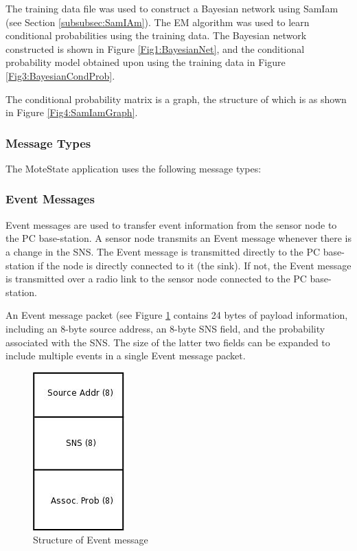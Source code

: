 \documentclass{sig-alternate-10pt}
\begin{document}
The training data file was used to construct a Bayesian network using SamIam
\cite{Samiam:2004}  (see Section \ref{subsubsec:SamIAm}). The EM algorithm
\cite{EMAlgoDempster:1977} was used to learn conditional probabilities using the
training data. The Bayesian network constructed is shown in Figure \ref{Fig1:BayesianNet}, and the
conditional probability model obtained upon using the training data  in Figure
\ref{Fig3:BayesianCondProb}.
 
 The conditional probability matrix is a graph, the structure of which is as
 shown in Figure \ref{Fig4:SamIamGraph}.
 



\subsubsection{Message Types} \label{subsubsec:MsgTypes}

The MoteState application uses the following message types:


\subsubsection*{Event Messages}

Event messages are used to transfer event information from the sensor node to the PC base-station. A sensor node transmits an Event message whenever there is a change in the SNS. The Event message is transmitted directly to the PC base-station if the node is directly connected to it (the sink). If not, the Event message is transmitted over a radio link to the sensor node connected to the PC base-station.

An Event message packet (see Figure \ref{Fig7:EventMsgStruct} contains 24 bytes of payload information, including an 8-byte source address, an 8-byte SNS field, and the probability associated with the SNS. The size of the latter two fields can be expanded to include multiple events in a single Event message packet.

  \begin{figure}[h]
\centering
\includegraphics[scale=0.5]{img/EventMsgStruct.png}
\caption{Structure of Event message} 
\label{Fig7:EventMsgStruct}
\end{figure}  
\end{document}

